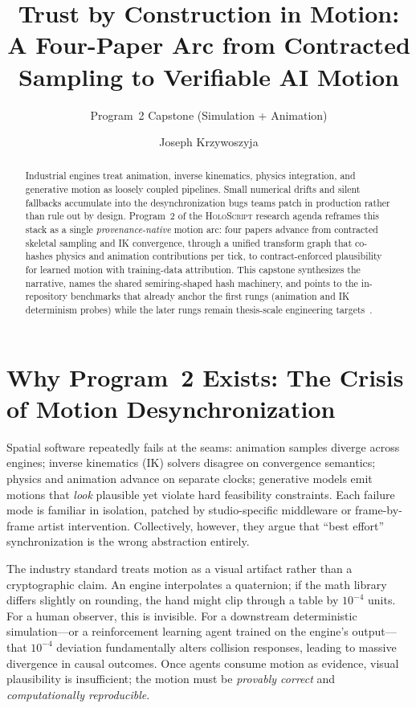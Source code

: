 \documentclass[sigconf,nonacm]{acmart}
\title{Trust by Construction in Motion:\\ A Four-Paper Arc from Contracted Sampling to Verifiable AI Motion}
\subtitle{Program~2 Capstone (Simulation + Animation)}
\author{Joseph Krzywoszyja}
\affiliation{%
  \institution{Infinitus Systems}
  \country{USA}
}
\newcommand{\holoscript}{\textsc{HoloScript}}
\begin{document}
\begin{abstract}
Industrial engines treat animation, inverse kinematics, physics integration,
and generative motion as loosely coupled pipelines. Small numerical drifts and
silent fallbacks accumulate into the desynchronization bugs teams patch in
production rather than rule out by design.
Program~2 of the \holoscript{} research agenda reframes this stack as a single
\emph{provenance-native} motion arc: four papers advance from contracted
skeletal sampling and IK convergence, through a unified transform graph that
co-hashes physics and animation contributions per tick, to contract-enforced
plausibility for learned motion with training-data attribution.
This capstone synthesizes the narrative, names the shared semiring-shaped hash
machinery, and points to the in-repository benchmarks that already anchor the
first rungs (animation and IK determinism probes) while the later rungs remain
thesis-scale engineering targets~\cite{paper-8-unified-siggraph2027,paper-9-motion-asia2027}.
\end{abstract}

\section{Why Program~2 Exists: The Crisis of Motion Desynchronization}

Spatial software repeatedly fails at the seams: animation samples diverge across engines; inverse kinematics (IK) solvers disagree on convergence semantics; physics and animation advance on separate clocks; generative models emit motions that \emph{look} plausible yet violate hard feasibility constraints. Each failure mode is familiar in isolation, patched by studio-specific middleware or frame-by-frame artist intervention. Collectively, however, they argue that ``best effort'' synchronization is the wrong abstraction entirely.

The industry standard treats motion as a visual artifact rather than a cryptographic claim. An engine interpolates a quaternion; if the math library differs slightly on rounding, the hand might clip through a table by $10^{-4}$ units. For a human observer, this is invisible. For a downstream deterministic simulation---or a reinforcement learning agent trained on the engine's output---that $10^{-4}$ deviation fundamentally alters collision responses, leading to massive divergence in causal outcomes. Once agents consume motion as evidence, visual plausibility is insufficient; the motion must be \emph{provably correct} and \emph{computationally reproducible}.
\end{document}
